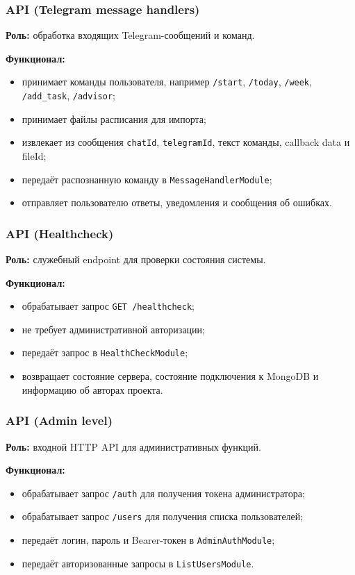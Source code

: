 \documentclass[10pt,a4paper,final]{article} %
\begin{document}
\subsubsection{API (Telegram message handlers)}

\textbf{Роль:} обработка входящих Telegram-сообщений и команд.

\textbf{Функционал:}
\begin{itemize}
    \item принимает команды пользователя, например \texttt{/start},
    \texttt{/today}, \texttt{/week}, \texttt{/add\_task}, \texttt{/advisor};
    \item принимает файлы расписания для импорта;
    \item извлекает из сообщения \texttt{chatId}, \texttt{telegramId},
    текст команды, callback data и fileId;
    \item передаёт распознанную команду в \texttt{MessageHandlerModule};
    \item отправляет пользователю ответы, уведомления и сообщения об ошибках.
\end{itemize}

\subsubsection{API (Healthcheck)}

\textbf{Роль:} служебный endpoint для проверки состояния системы.

\textbf{Функционал:}
\begin{itemize}
    \item обрабатывает запрос \texttt{GET /healthcheck};
    \item не требует административной авторизации;
    \item передаёт запрос в \texttt{HealthCheckModule};
    \item возвращает состояние сервера, состояние подключения к MongoDB и
    информацию об авторах проекта.
\end{itemize}

\subsubsection{API (Admin level)}

\textbf{Роль:} входной HTTP API для административных функций.

\textbf{Функционал:}
\begin{itemize}
    \item обрабатывает запрос \texttt{/auth} для получения токена администратора;
    \item обрабатывает запрос \texttt{/users} для получения списка пользователей;
    \item передаёт логин, пароль и Bearer-токен в \texttt{AdminAuthModule};
    \item передаёт авторизованные запросы в \texttt{ListUsersModule}.
\end{itemize}
\end{document}
